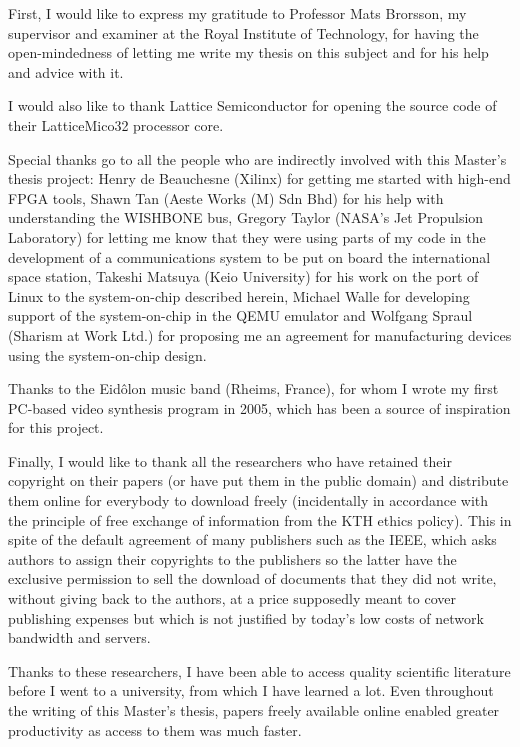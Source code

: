 \documentclass[a4paper,11pt]{kthesis}
\begin{document}
\begin{acknowledgments}
First, I would like to express my gratitude to Professor Mats Brorsson, my supervisor and examiner at the Royal Institute of Technology, for having the open-mindedness of letting me write my thesis on this subject and for his help and advice with it.

I would also like to thank Lattice Semiconductor for opening the source code of their LatticeMico32 processor core.

Special thanks go to all the people who are indirectly involved with this Master's thesis project: Henry de Beauchesne (Xilinx) for getting me started with high-end FPGA tools, Shawn Tan (Aeste Works (M) Sdn Bhd) for his help with understanding the WISHBONE bus, Gregory Taylor (NASA's Jet Propulsion Laboratory) for letting me know that they were using parts of my code in the development of a communications system to be put on board the international space station, Takeshi Matsuya (Keio University) for his work on the port of Linux to the system-on-chip described herein, Michael Walle for developing support of the system-on-chip in the QEMU emulator and Wolfgang Spraul (Sharism at Work Ltd.) for proposing me an agreement for manufacturing devices using the system-on-chip design.

Thanks to the Eid\^olon music band (Rheims, France), for whom I wrote my first PC-based video synthesis program in 2005, which has been a source of inspiration for this project.

Finally, I would like to thank all the researchers who have retained their copyright on their papers (or have put them in the public domain) and distribute them online for everybody to download freely (incidentally in accordance with the principle of free exchange of information from the KTH ethics policy). This in spite of the default agreement of many publishers such as the IEEE, which asks authors to assign their copyrights to the publishers so the latter have the exclusive permission to sell the download of documents that they did not write, without giving back to the authors, at a price supposedly meant to cover publishing expenses but which is not justified by today's low costs of network bandwidth and servers.

Thanks to these researchers, I have been able to access quality scientific literature before I went to a university, from which I have learned a lot. Even throughout the writing of this Master's thesis, papers freely available online enabled greater productivity as access to them was much faster.
\end{acknowledgments}
\end{document}
